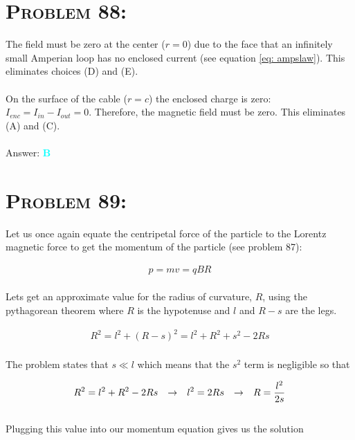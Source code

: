 \documentclass{article}
\begin{document}

\section{\textsc{Problem 88:}}The field must be zero at the center ($r = 0$) due to the face that an infinitely small Amperian loop has no enclosed current (see equation \ref{eq: ampslaw}). This eliminates choices (D) and (E).\\
\\
On the surface of the cable ($r = c$) the enclosed charge is zero: $I_{enc} = I_{in} - I_{out} = 0$. Therefore, the magnetic field must be zero. This eliminates (A) and (C).
\\\\
Answer: \textbf{\textcolor{cyan}B}\\


\section{\textsc{Problem 89:}} Let us once again equate the centripetal force of the particle to the Lorentz magnetic force to get the momentum of the particle (see problem 87):

\begin{gather}
p = mv = qBR\nonumber
\end{gather}
\\
Lets get an approximate value for the radius of curvature, $R$, using the pythagorean theorem where $R$ is the hypotenuse and $l$ and $R-s$ are the legs.

\begin{gather}
R^{2} = l^{2} + (R-s)^{2} = l^{2} + R^{2} + s^{2} - 2Rs\nonumber
\end{gather}
\\
The problem states that $s \ll l$ which means that the $s^{2}$ term is negligible so that

\begin{gather}
R^{2} = l^{2} + R^{2} - 2Rs \hspace{.1in} \rightarrow \hspace{.1in} l^{2} = 2Rs \hspace{.1in} \rightarrow \hspace{.1in} R = \frac{l^{2}}{2s} \nonumber
\end{gather}
\\
Plugging this value into our momentum equation gives us the solution
\end{document}
